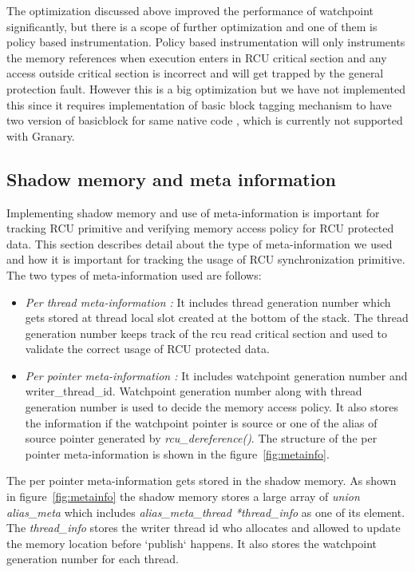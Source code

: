 The optimization discussed above improved the performance of watchpoint significantly, but there is a scope of further optimization and one of them is policy based instrumentation. Policy based instrumentation will only instruments the memory references when execution enters in RCU critical section and any access outside critical section is incorrect and will get trapped by the general protection fault. However this is a big optimization but we have not implemented this since it requires implementation of basic block tagging mechanism to have two version of basicblock for same native code , which is currently not supported with Granary.


\subsection{Shadow memory and meta information}
Implementing shadow memory and use of meta-information is important for tracking RCU primitive and verifying memory access policy for RCU protected data. This section describes detail about the type of meta-information we used and how it is important for tracking the usage of RCU synchronization primitive. The two types of meta-information used are follows: 
\begin{itemize}
 	\item \emph{Per thread meta-information :} It includes thread generation number which gets stored at thread local slot created at the bottom of the stack. The thread generation number keeps track of the rcu read critical section and used to validate the correct usage of RCU protected data.
   	\item \emph{Per pointer meta-information :} It includes watchpoint generation number and writer\_thread\_id.  Watchpoint generation number along with thread generation number is used to decide the memory access policy. It also stores the information if the watchpoint pointer is source or one of the alias of source pointer generated by \emph{rcu\_dereference()}. The structure of the per pointer meta-information is shown in the figure~\ref{fig:metainfo}. 
\end{itemize} 

The per pointer meta-information gets stored in the shadow memory. As shown in figure~\ref{fig:metainfo} the shadow memory stores a large array of \emph{union alias\_meta} which includes \emph{ alias\_meta\_thread *thread\_info} as one of its element. The \emph{thread\_info} stores the writer thread id who allocates and allowed to update the memory location before `publish` happens. It also stores the watchpoint generation number for each thread. 

